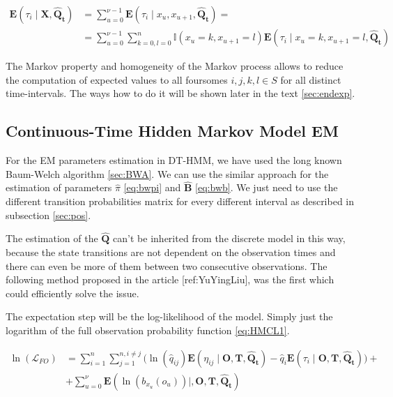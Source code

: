 \documentclass[thesis=M,english]{FITthesis}[2012/10/20]
\newcommand{\matr}[1]{\mathbf{#1}}
\begin{document}
\begin{equation}
\begin{aligned}  
\mathbf{E}( \tau_i \mid \matr{X}, \matr{\hat Q_t} ) &= \sum_{u=0}^{\nu-1} \mathbf{E}(\tau_i \mid x_u, x_{u+1}, \matr{ \hat Q_t } ) = \\
&= \sum_{u=0}^{\nu-1} \sum_{k=0,l=0}^{n} \mathbb{I}( x_u = k, x_{u+1} = l ) \mathbf{E}(\tau_i \mid x_u = k, x_{u+1} = l, \matr{\hat Q_t} )
\end{aligned}
\end{equation}
   
The Markov property and homogeneity of the Markov process allows to reduce the computation of expected values to all foursomes $i,j,k,l \in S$ for all distinct time-intervals. The ways how to do it will be shown later in the text \ref{sec:endexp}.     
   
\subsection{Continuous-Time Hidden Markov Model EM}

For the EM parameters estimation in DT-HMM, we have used the long known Baum-Welch algorithm \ref{sec:BWA}. We can use the similar approach for the estimation of parameters $\hat \pi$ \eqref{eq:bwpi} and $\matr{ \hat B }$ \eqref{eq:bwb}. We just need to use the different transition probabilities matrix for every different interval as described in subsection \ref{sec:pos}.  

The estimation of the $\matr{ \hat Q }$ can't be inherited from the discrete model in this way, because the state transitions are not dependent on the observation times and there can even be more of them between two consecutive observations. The following method proposed in the article [ref:YuYingLiu], was the first which could efficiently solve the issue.        

The expectation step will be the log-likelihood of the model. Simply just the logarithm of the full observation probability function \eqref{eq:HMCL1}.

\begin{equation}\label{eq:EMCTHMM}
\begin{aligned}  
 \ln(\mathcal{L}_{FO}) &= \sum_{i=1}^{n} \sum_{j=1}^{n, i \neq j} \big( \ln( \hat q_{ij}) \mathbf{E}( \eta_{ij} \mid \matr{O},\matr{T}, \matr{ \hat Q_t } ) - \hat q_i \mathbf{E}( \tau_i \mid \matr{O},\matr{T}, \matr{ \hat Q_t } ) \big) + \\
    &+ \sum_{u=0}^{\nu} \mathbf{E}( \ln( b_{ x_u }(o_u) ) \mid, \matr{O},\matr{T},\matr{\hat Q_t} )
\end{aligned}
\end{equation}
\end{document}
